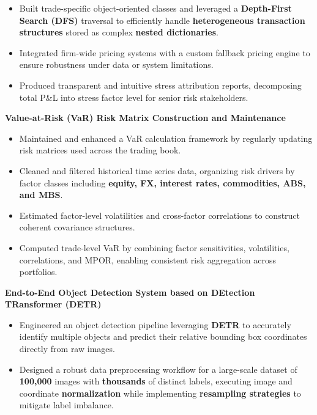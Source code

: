 \begin{cventries}
{\begin{cvitems}
\begin{itemize}
          \item Built {trade-specific object-oriented classes} and leveraged a \textbf{Depth-First Search (DFS)} traversal to efficiently handle \textbf{heterogeneous transaction structures} stored as complex \textbf{nested dictionaries}.
          \item Integrated firm-wide pricing systems with a {custom fallback pricing engine} to ensure robustness under data or system limitations.
          \item Produced transparent and intuitive {stress attribution reports}, decomposing total P\&L into stress factor level for senior risk stakeholders.
        \end{itemize}
      \vspace{0.5mm}
      \item \textbf{Value-at-Risk (VaR) Risk Matrix Construction and Maintenance}
        \begin{itemize}
          \item Maintained and enhanced a VaR calculation framework by regularly updating {risk matrices} used across the trading book.
          \item {Cleaned and filtered historical time series data, organizing risk drivers by factor classes including \textbf{equity, FX, interest rates, commodities, ABS, and MBS}.}
          \item Estimated factor-level {volatilities and cross-factor correlations} to construct coherent covariance structures.
          \item Computed trade-level VaR by combining factor sensitivities, volatilities, correlations, and {MPOR}, enabling consistent risk aggregation across portfolios.
        \end{itemize}
      \vspace{0.5mm}
      \item {\textbf{End-to-End Object Detection System based on DEtection TRansformer (DETR)}}
        \begin{itemize}
          \item {Engineered an object detection pipeline leveraging \textbf{DETR} to accurately identify multiple objects and predict their relative bounding box coordinates directly from raw images.}
          \item {Designed a robust data preprocessing workflow for a large-scale dataset of \textbf{100,000} images with \textbf{thousands} of distinct labels, executing image and coordinate \textbf{normalization} while implementing \textbf{resampling strategies} to mitigate label imbalance.}

\end{itemize}
\end{cvitems}}
\end{cventries}
